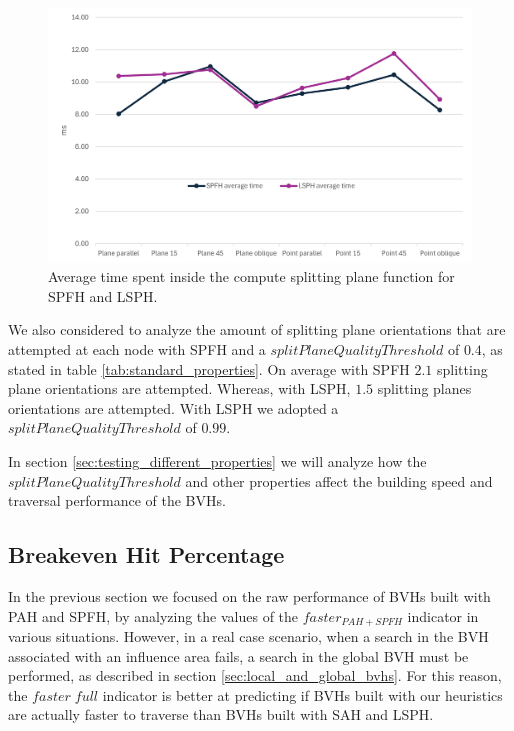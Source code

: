 \documentclass{PoliMi_MasterThesis}
\begin{document}
\begin{figure}[H] 
	\centering
	\includegraphics[width=\textwidth]{Images/spfh_build_time_chart.png}
	\caption{Average time spent inside the compute splitting plane function for SPFH and LSPH.}
	\label{fig:spfh_build_time_chart}
\end{figure}

We also considered to analyze the amount of splitting plane orientations that are attempted at each node with SPFH and a $splitPlaneQualityThreshold$ of $0.4$, as stated in table \ref{tab:standard_properties}. On average with SPFH $2.1$ splitting plane orientations are attempted. Whereas, with LSPH, $1.5$ splitting planes orientations are attempted. With LSPH we adopted a $splitPlaneQualityThreshold$ of $0.99$.

In section \ref{sec:testing_different_properties} we will analyze how the $splitPlaneQualityThreshold$ and other properties affect the building speed and traversal performance of the BVHs.

\subsection{Breakeven Hit Percentage} \label{ssec:breakeven_hit_percentage}
In the previous section we focused on the raw performance of BVHs built with PAH and SPFH, by analyzing the values of the $faster_{PAH+SPFH}$ indicator in various situations. However, in a real case scenario, when a search in the BVH associated with an influence area fails, a search in the global BVH must be performed, as described in section \ref{sec:local_and_global_bvhs}. For this reason, the $faster \; full$ indicator is better at predicting if BVHs built with our heuristics are actually faster to traverse than BVHs built with SAH and LSPH.
\end{document}

